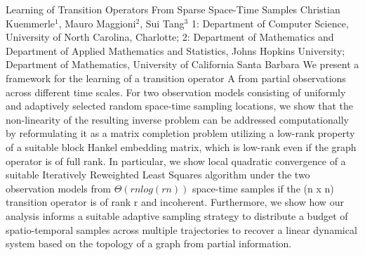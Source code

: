 \vspace{1.5ex}
\abs
{Learning of Transition Operators From Sparse Space-Time Samples}
{Christian Kuemmerle$^1$, Mauro Maggioni$^2$, Sui Tang$^3$}
{1: Department of Computer Science, University of North Carolina, Charlotte; 2: Department of Mathematics and Department of Applied Mathematics and Statistics, Johns Hopkins University; Department of Mathematics, University of California Santa Barbara}
{We present a framework for the learning of a transition operator A from partial observations across different time scales. For two observation models consisting of uniformly and adaptively selected random space-time sampling locations, we show that the non-linearity of the resulting inverse problem can be addressed computationally by reformulating it as a matrix completion problem utilizing a low-rank property of a suitable block Hankel embedding matrix, which is low-rank even if the graph operator is of full rank.
In particular, we show local quadratic convergence of a suitable Iteratively Reweighted Least Squares algorithm under the two observation models from $\Theta(r n log(rn))$ space-time samples if the (n x n) transition operator is of rank r and incoherent. Furthermore, we show how our analysis informs a suitable adaptive sampling strategy to distribute a budget of spatio-temporal samples across multiple trajectories to recover a linear dynamical system based on the topology of a graph from partial information.}



